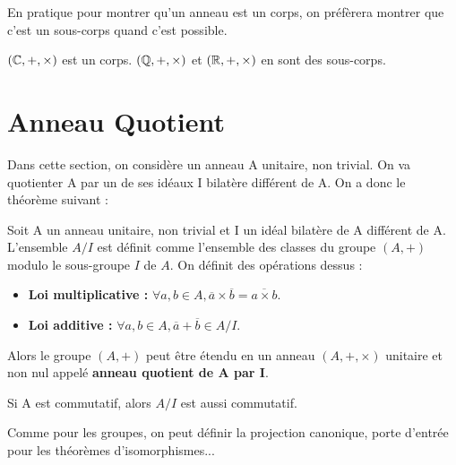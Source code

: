 En pratique pour montrer qu'un anneau est un corps, on préfèrera montrer que c'est un sous-corps quand c'est possible. 

\begin{example}
    $(\mathbb{C},+,\times)$ est un corps. $(\mathbb{Q},+,\times)$ et $(\mathbb{R},+,\times)$ en sont des sous-corps. 
\end{example}


\section{Anneau Quotient}

Dans cette section, on considère un anneau A unitaire, non trivial. 
On va quotienter A par un de ses idéaux I bilatère différent de A. 
On a donc le théorème suivant : 

\begin{theorem}
    Soit A un anneau unitaire, non trivial et I un idéal bilatère de A différent de A. 
    L'ensemble $A/I$ est définit comme l'ensemble des classes du groupe $(A,+)$ modulo le 
    sous-groupe $I$ de $A$. On définit des opérations dessus : 
    \begin{itemize}
        \item \textbf{Loi multiplicative : } $ \forall a, b \in A, \overline{a} \times \overline{b} = \overline{a \times b}$. 
        \item \textbf{Loi additive : } $ \forall a,b \in A, \overline{a} + \overline{b} \in A/I$. 
    \end{itemize}
    Alors le groupe $(A,+)$ peut être étendu en un anneau $(A,+,\times)$ unitaire et non nul appelé 
    \textbf{anneau quotient de A par I}. 
\end{theorem}

\begin{proposition}
    Si A est commutatif, alors $A/I$ est aussi commutatif. 
\end{proposition}

Comme pour les groupes, on peut définir la projection canonique, porte d'entrée pour les théorèmes d'isomorphismes... 

